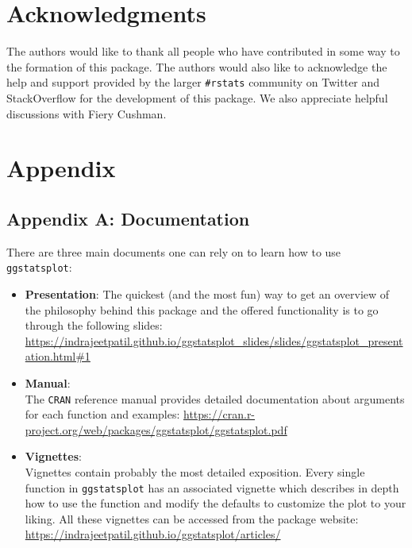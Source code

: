 \documentclass[
]{article}
\begin{document}
\newpage

\hypertarget{acknowledgments}{%
\section{Acknowledgments}\label{acknowledgments}}

The authors would like to thank all people who have contributed in some way to
the formation of this package. The authors would also like to acknowledge the
help and support provided by the larger \texttt{\#rstats} community on Twitter and
StackOverflow for the development of this package. We also appreciate helpful
discussions with Fiery Cushman.

\newpage

\hypertarget{appendix}{%
\section{Appendix}\label{appendix}}

\hypertarget{appendix-a-documentation}{%
\subsection{Appendix A: Documentation}\label{appendix-a-documentation}}

There are three main documents one can rely on to learn how to use
\texttt{ggstatsplot}:

\begin{itemize}
\item
  \textbf{Presentation}:
  The quickest (and the most fun) way to get an overview of
  the philosophy behind this package and the offered functionality is to go
  through the following slides:
  \url{https://indrajeetpatil.github.io/ggstatsplot_slides/slides/ggstatsplot_presentation.html\#1}
\item
  \textbf{Manual}:\\
  The \texttt{CRAN} reference manual provides detailed documentation about arguments
  for each function and examples:
  \url{https://cran.r-project.org/web/packages/ggstatsplot/ggstatsplot.pdf}
\item
  \textbf{Vignettes}:\\
  Vignettes contain probably the most detailed exposition. Every single
  function in \texttt{ggstatsplot} has an associated vignette which describes in
  depth how to use the function and modify the defaults to customize the plot
  to your liking. All these vignettes can be accessed from the package
  website: \url{https://indrajeetpatil.github.io/ggstatsplot/articles/}
\end{itemize}
\end{document}
